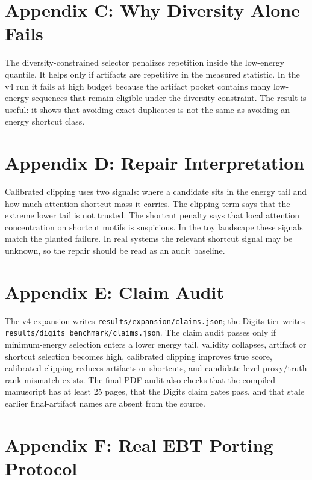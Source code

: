 \documentclass{article}
\begin{document}
\section{Appendix C: Why Diversity Alone Fails}

The diversity-constrained selector penalizes repetition inside the low-energy
quantile. It helps only if artifacts are repetitive in the measured statistic.
In the v4 run it fails at high budget because the artifact pocket contains many
low-energy sequences that remain eligible under the diversity constraint. The
result is useful: it shows that avoiding exact duplicates is not the same as
avoiding an energy shortcut class.

\section{Appendix D: Repair Interpretation}

Calibrated clipping uses two signals: where a candidate sits in the energy tail
and how much attention-shortcut mass it carries. The clipping term says that
the extreme lower tail is not trusted. The shortcut penalty says that local
attention concentration on shortcut motifs is suspicious. In the toy landscape
these signals match the planted failure. In real systems the relevant shortcut
signal may be unknown, so the repair should be read as an audit baseline.

\section{Appendix E: Claim Audit}

The v4 expansion writes \texttt{results/expansion/claims.json}; the Digits tier
writes \texttt{results/digits\_benchmark/claims.json}. The claim audit passes
only if minimum-energy selection enters a lower energy tail, validity
collapses, artifact or shortcut selection becomes high, calibrated clipping
improves true score, calibrated clipping reduces artifacts or shortcuts, and
candidate-level proxy/truth rank mismatch exists. The final PDF audit also
checks that the compiled manuscript has at least 25 pages, that the Digits
claim gates pass, and that stale earlier final-artifact names are absent from
the source.

\section{Appendix F: Real EBT Porting Protocol}
\end{document}
